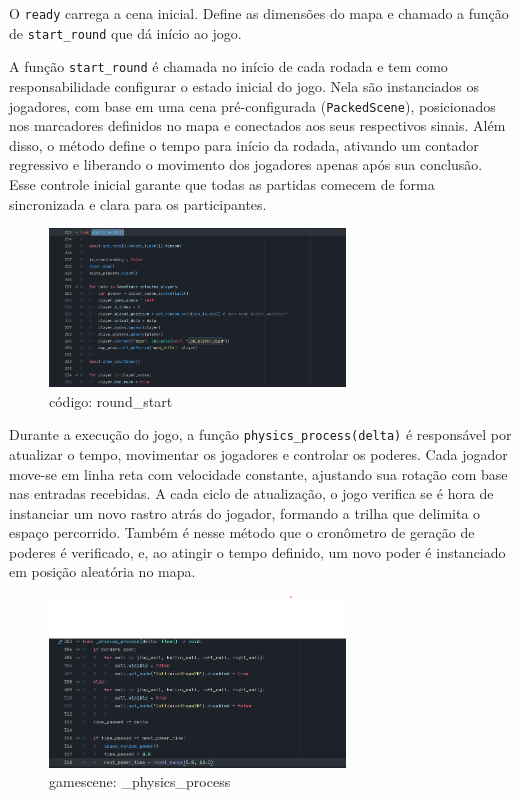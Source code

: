 O \texttt{ready} carrega a cena inicial. Define as dimensões do mapa e chamado a função de \texttt{start\_round} que dá início ao jogo.

A função \texttt{start\_round} é chamada no início de cada rodada e tem como responsabilidade configurar o estado inicial do jogo. Nela são instanciados os jogadores, com base em uma cena pré-configurada (\texttt{PackedScene}), posicionados nos marcadores definidos no mapa e conectados aos seus respectivos sinais. Além disso, o método define o tempo para início da rodada, ativando um contador regressivo e liberando o movimento dos jogadores apenas após sua conclusão. Esse controle inicial garante que todas as partidas comecem de forma sincronizada e clara para os participantes.

\begin{figure}[htbp]
    \centering
    \caption{código: round\_start}
    \label{fig:round_start}
    \includegraphics[width=0.7\textwidth]{figuras/round_start.png}
\end{figure}

Durante a execução do jogo, a função \texttt{physics\_process(delta)} é responsável por atualizar o tempo, movimentar os jogadores e controlar os poderes. Cada jogador move-se em linha reta com velocidade constante, ajustando sua rotação com base nas entradas recebidas. A cada ciclo de atualização, o jogo verifica se é hora de instanciar um novo rastro atrás do jogador, formando a trilha que delimita o espaço percorrido. Também é nesse método que o cronômetro de geração de poderes é verificado, e, ao atingir o tempo definido, um novo poder é instanciado em posição aleatória no mapa.

\begin{figure}[htbp]
    \centering
    \caption{gamescene: \_physics\_process}
    \label{fig:player_pp}
    \includegraphics[width=0.7\textwidth]{figuras/game_process.png}
\end{figure}

